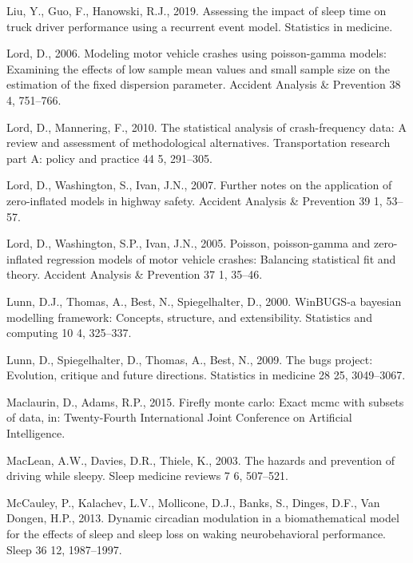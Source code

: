 \documentclass[12pt]{book}
\numberwithin{equation}{chapter}
\begin{document}
\leavevmode\hypertarget{ref-liu2019assessing}{}%
Liu, Y., Guo, F., Hanowski, R.J., 2019. Assessing the impact of sleep time on truck driver performance using a recurrent event model. Statistics in medicine.

\leavevmode\hypertarget{ref-lord2006modeling}{}%
Lord, D., 2006. Modeling motor vehicle crashes using poisson-gamma models: Examining the effects of low sample mean values and small sample size on the estimation of the fixed dispersion parameter. Accident Analysis \& Prevention 38 4, 751--766.

\leavevmode\hypertarget{ref-lord2010statistical}{}%
Lord, D., Mannering, F., 2010. The statistical analysis of crash-frequency data: A review and assessment of methodological alternatives. Transportation research part A: policy and practice 44 5, 291--305.

\leavevmode\hypertarget{ref-lord2007further}{}%
Lord, D., Washington, S., Ivan, J.N., 2007. Further notes on the application of zero-inflated models in highway safety. Accident Analysis \& Prevention 39 1, 53--57.

\leavevmode\hypertarget{ref-lord2005poisson}{}%
Lord, D., Washington, S.P., Ivan, J.N., 2005. Poisson, poisson-gamma and zero-inflated regression models of motor vehicle crashes: Balancing statistical fit and theory. Accident Analysis \& Prevention 37 1, 35--46.

\leavevmode\hypertarget{ref-lunn2000winbugs}{}%
Lunn, D.J., Thomas, A., Best, N., Spiegelhalter, D., 2000. WinBUGS-a bayesian modelling framework: Concepts, structure, and extensibility. Statistics and computing 10 4, 325--337.

\leavevmode\hypertarget{ref-lunn2009bugs}{}%
Lunn, D., Spiegelhalter, D., Thomas, A., Best, N., 2009. The bugs project: Evolution, critique and future directions. Statistics in medicine 28 25, 3049--3067.

\leavevmode\hypertarget{ref-maclaurin2015firefly}{}%
Maclaurin, D., Adams, R.P., 2015. Firefly monte carlo: Exact mcmc with subsets of data, in: Twenty-Fourth International Joint Conference on Artificial Intelligence.

\leavevmode\hypertarget{ref-maclean2003hazards}{}%
MacLean, A.W., Davies, D.R., Thiele, K., 2003. The hazards and prevention of driving while sleepy. Sleep medicine reviews 7 6, 507--521.

\leavevmode\hypertarget{ref-mccauley2013dynamic}{}%
McCauley, P., Kalachev, L.V., Mollicone, D.J., Banks, S., Dinges, D.F., Van Dongen, H.P., 2013. Dynamic circadian modulation in a biomathematical model for the effects of sleep and sleep loss on waking neurobehavioral performance. Sleep 36 12, 1987--1997.
\end{document}
